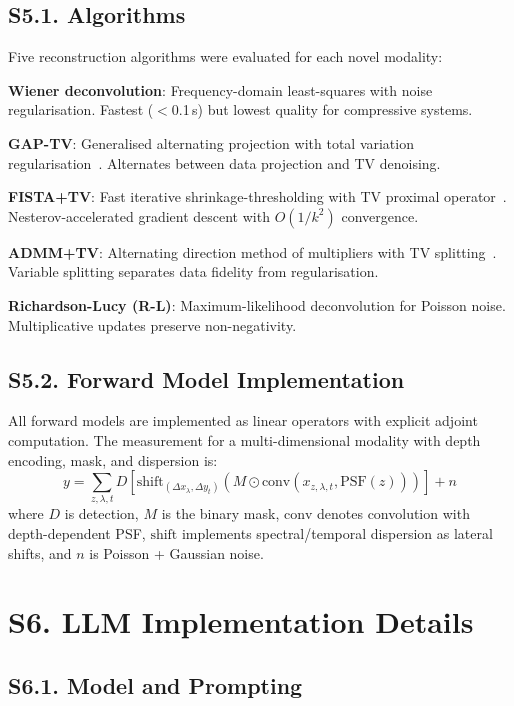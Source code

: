 \documentclass[11pt,a4paper]{article}
\begin{document}
\subsection{S5.1. Algorithms}

Five reconstruction algorithms were evaluated for each novel modality:

\textbf{Wiener deconvolution}: Frequency-domain least-squares with noise regularisation.  Fastest ($<$0.1\,s) but lowest quality for compressive systems.

\textbf{GAP-TV}: Generalised alternating projection with total variation regularisation~\cite{meng2020gap}.  Alternates between data projection and TV denoising.

\textbf{FISTA+TV}: Fast iterative shrinkage-thresholding with TV proximal operator~\cite{beck2009fista}.  Nesterov-accelerated gradient descent with $O(1/k^2)$ convergence.

\textbf{ADMM+TV}: Alternating direction method of multipliers with TV splitting~\cite{boyd2011admm}.  Variable splitting separates data fidelity from regularisation.

\textbf{Richardson-Lucy (R-L)}: Maximum-likelihood deconvolution for Poisson noise.  Multiplicative updates preserve non-negativity.

\subsection{S5.2. Forward Model Implementation}

All forward models are implemented as linear operators with explicit adjoint computation.  The measurement for a multi-dimensional modality with depth encoding, mask, and dispersion is:
\[
y = \sum_{z,\lambda,t} D\left[ \text{shift}_{(\Delta x_\lambda, \Delta y_t)} \left( M \odot \text{conv}(x_{z,\lambda,t}, \text{PSF}(z)) \right) \right] + n
\]
where $D$ is detection, $M$ is the binary mask, $\text{conv}$ denotes convolution with depth-dependent PSF, $\text{shift}$ implements spectral/temporal dispersion as lateral shifts, and $n$ is Poisson + Gaussian noise.

\section{S6. LLM Implementation Details}

\subsection{S6.1. Model and Prompting}
\end{document}
